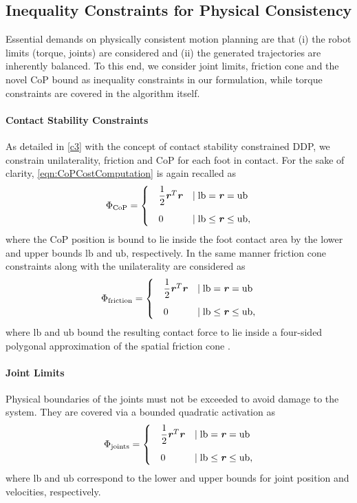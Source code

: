 \subsection{Inequality Constraints for Physical Consistency}
Essential demands on physically consistent motion planning are that (i) the robot limits (torque, joints) are considered and (ii) the generated trajectories are inherently balanced. To this end, we consider joint limits, friction cone and the novel \gls{CoP} bound as inequality constraints in our formulation, while torque constraints are covered in the algorithm itself.

\paragraph{Contact Stability Constraints}
As detailed in \cref{c3} with the concept of contact stability constrained \gls{DDP}, we constrain unilaterality, friction and \gls{CoP} for each foot in contact. For the sake of clarity, \cref{eqn:CoPCostComputation} is again recalled as 
\begin{equation*}
\Phi_{\text{CoP}}=
\begin{cases}
\quad\dfrac{1}{2}\bm{\mathit{r}}^T\bm{\mathit{r}} &\mid \text{lb} = \bm{\mathit{r}} = \text{ub} \\[10pt]
\quad 0 &\mid \text{lb} \leq \bm{\mathit{r}} \leq \text{ub},
\end{cases}
\end{equation*}
where the \gls{CoP} position is bound to lie inside the foot contact area by the lower and upper bounds $\text{lb}$ and $\text{ub}$, respectively.
In the same manner friction cone constraints along with the unilaterality are considered as
\begin{equation*}
\Phi_{\text{friction}}=
\begin{cases}
\quad\dfrac{1}{2}\bm{\mathit{r}}^T\bm{\mathit{r}} &\mid \text{lb} = \bm{\mathit{r}} = \text{ub} \\[10pt]
\quad 0 &\mid \text{lb} \leq \bm{\mathit{r}} \leq \text{ub},
\end{cases}
\end{equation*}
where $\text{lb}$ and $\text{ub}$ bound the resulting contact force to lie inside a four-sided polygonal approximation of the spatial friction cone \cite{kao2016contact}.

\paragraph{Joint Limits}
Physical boundaries of the joints must not be exceeded to avoid damage to the system. They are covered via a bounded quadratic activation as
\begin{equation*}
\Phi_{\text{joints}}=
\begin{cases}
\quad\dfrac{1}{2}\bm{\mathit{r}}^T\bm{\mathit{r}} &\mid \text{lb} = \bm{\mathit{r}} = \text{ub} \\[10pt]
\quad 0 &\mid \text{lb} \leq \bm{\mathit{r}} \leq \text{ub},
\end{cases}
\end{equation*}
where $\text{lb}$ and $\text{ub}$ correspond to the lower and upper bounds for joint position and velocities, respectively. 

